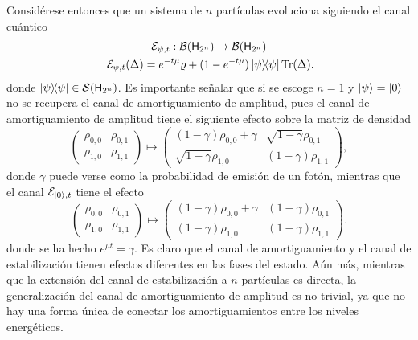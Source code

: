 Considérese entonces que un sistema de $n$ partículas evoluciona siguiendo el canal cuántico
\begin{gather}
    \mcE_{\psi,t}:\mcB(\hilbert_{2^{n}}) \rightarrow \mcB(\hilbert_{2^{n}})\nonumber\\
    \mcE_{\psi,t}(\Delta)=e^{-t\mu}\varrho+(1-e^{-t \mu})\dyad{\psi}\Tr(\Delta)\rlap{.}\nonumber
\end{gather}
donde $\dyad{\psi}\in \densityspace{2^{n}}$. Es importante señalar que si se escoge $n=1$ y $\ket{\psi}=\ket{0}$ no se recupera el canal de amortiguamiento de amplitud, pues el canal de amortiguamiento de amplitud tiene el siguiente efecto sobre la matriz de densidad
\begin{equation}
    \begin{pmatrix}
        \rho_{0,0} & \rho_{0,1} \\
        \rho_{1,0} & \rho_{1,1}
    \end{pmatrix}\mapsto\begin{pmatrix}
        (1-\gamma)\rho_{0,0}+\gamma & \sqrt{1-\gamma}\rho_{0,1} \\
        \sqrt{1-\gamma}\rho_{1,0} & (1-\gamma)\rho_{1,1}
    \end{pmatrix},\nonumber
\end{equation}
donde $\gamma$ puede verse como la probabilidad de emisión de un fotón, mientras que el canal $\mathcal{E}_{\ket{0},t}$ tiene el efecto
\begin{equation}
    \begin{pmatrix}
        \rho_{0,0} & \rho_{0,1} \\
        \rho_{1,0} & \rho_{1,1}
    \end{pmatrix}\mapsto\begin{pmatrix}
        (1-\gamma)\rho_{0,0}+\gamma & (1-\gamma)\rho_{0,1} \\
        (1-\gamma)\rho_{1,0} & (1-\gamma)\rho_{1,1}
    \end{pmatrix}.\nonumber
\end{equation}
donde se ha hecho $e^{\mu t}=\gamma$. Es claro que el canal de amortiguamiento y el canal de estabilización tienen efectos diferentes en las fases del estado. Aún más, mientras que la extensión del canal de estabilización a $n$ partículas es directa, la generalización del canal de amortiguamiento de amplitud es no trivial, ya que no hay una forma única de conectar los amortiguamientos entre los niveles energéticos.

